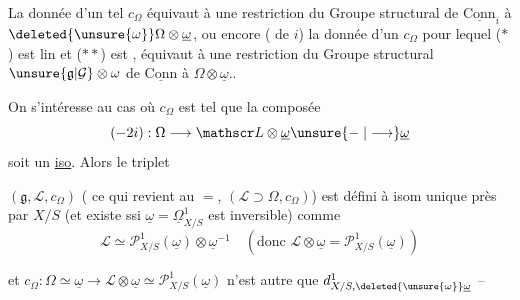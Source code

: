 

La donnée d'un tel $c_\Omega$ équivaut à une restriction du Groupe structural de $\underline{\mathrm{Conn}}_i$  à $\deleted{\unsure{\omega}}\Omega\otimes\underline\omega$, ou encore ( de $i$) la donnée d'un $c_\Omega$ pour lequel ($\ast$) est lin et ($\ast\ast$) est , équivaut à une restriction du Groupe structural $\unsure{\mathfrak g|\mathcal G}\otimes\omega$ de $\underline{\mathrm{Conn}}$ à $\Omega\otimes\underline\omega$..

On s'intéresse au cas où  $c_\Omega$ est tel que la composée
\[ (-2i):\Omega\longrightarrow\mathscr L\otimes\underline\omega\unsure{\relbar|\longrightarrow}\underline\omega \]
soit un \uline{iso}.  Alors  le triplet

$(\mathfrak g,\mathscr L,c_\Omega)$ ( ce qui revient au $=$, $(\mathscr L\supset\Omega,c_\Omega)$) est défini à isom unique près par $X/S$ (et existe ssi $\underline\omega=\underline\Omega^1_{X/S}$ est inversible) comme
\[ \mathscr L\simeq\mathcal P^1_{X/S}(\underline\omega)\otimes\underline\omega^{-1}\quad(\text{donc }\mathscr L\otimes\underline\omega=\mathcal P^1_{X/S}(\underline\omega)) \]

et $c_\Omega:\Omega\simeq\underline\omega\longrightarrow\mathscr L\otimes\underline\omega\simeq\mathcal P^1_{X/S}(\underline\omega)$ n'est autre que $d^1_{X/S,\deleted{\unsure{\omega}}\underline\omega}$ --

